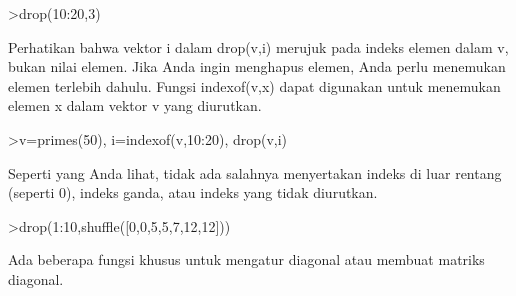 \documentclass[a4paper,10pt]{article}
\begin{document}
\begin{eulernotebook}
\begin{eulercomment}
\begin{eulercomment}
\begin{eulercomment}
\begin{eulercomment}
\begin{eulercomment}
\begin{eulercomment}
\begin{eulerprompt}
>drop(10:20,3)
\end{eulerprompt}
\begin{euleroutput}
  [10,  11,  13,  14,  15,  16,  17,  18,  19,  20]
\end{euleroutput}
\begin{eulercomment}
Perhatikan bahwa vektor i dalam drop(v,i) merujuk pada indeks elemen
dalam v, bukan nilai elemen. Jika Anda ingin menghapus elemen, Anda
perlu menemukan elemen terlebih dahulu. Fungsi indexof(v,x) dapat
digunakan untuk menemukan elemen x dalam vektor v yang diurutkan.
\end{eulercomment}
\begin{eulerprompt}
>v=primes(50), i=indexof(v,10:20), drop(v,i)
\end{eulerprompt}
\begin{euleroutput}
  [2,  3,  5,  7,  11,  13,  17,  19,  23,  29,  31,  37,  41,  43,  47]
  [0,  5,  0,  6,  0,  0,  0,  7,  0,  8,  0]
  [2,  3,  5,  7,  23,  29,  31,  37,  41,  43,  47]
\end{euleroutput}
\begin{eulercomment}
Seperti yang Anda lihat, tidak ada salahnya menyertakan indeks di luar
rentang (seperti 0), indeks ganda, atau indeks yang tidak diurutkan.
\end{eulercomment}
\begin{eulerprompt}
>drop(1:10,shuffle([0,0,5,5,7,12,12]))
\end{eulerprompt}
\begin{euleroutput}
  [1,  2,  3,  4,  6,  8,  9,  10]
\end{euleroutput}
\begin{eulercomment}
Ada beberapa fungsi khusus untuk mengatur diagonal atau membuat
matriks diagonal.


\end{eulercomment}
\end{eulercomment}
\end{eulercomment}
\end{eulercomment}
\end{eulercomment}
\end{eulercomment}
\end{eulercomment}
\end{eulernotebook}
\end{document}
